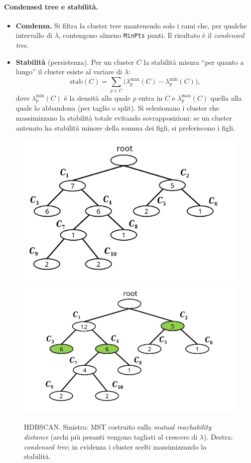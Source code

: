 \paragraph{Condensed tree e stabilità.}
\begin{itemize}
  \item \textbf{Condensa.} Si filtra la cluster tree mantenendo solo i rami che, per qualche intervallo di \(\lambda\), contengono almeno \texttt{MinPts} punti. Il risultato è il \emph{condensed tree}.
  \item \textbf{Stabilità} (persistenza). Per un cluster \(C\) la stabilità misura “per quanto a lungo” il cluster esiste al variare di \(\lambda\):
  \[
  \mathrm{stab}(C)=\sum_{p\in C}\bigl(\lambda^{\text{max}}_{p}(C)-\lambda^{\text{min}}_{p}(C)\bigr),
  \]
  dove \(\lambda^{\text{min}}_{p}(C)\) è la densità alla quale \(p\) entra in \(C\) e \(\lambda^{\text{max}}_{p}(C)\) quella alla quale lo abbandona (per taglio o split). Si selezionano i cluster che massimizzano la stabilità totale evitando sovrapposizioni: se un cluster antenato ha stabilità minore della somma dei figli, si preferiscono i figli.
\end{itemize}

\begin{figure}[htbp]
  \centering
  \includegraphics[width=.46\textwidth]{images/hdbscan_mst.png}\hfill
  \includegraphics[width=.46\textwidth]{images/hdbscan_condensed_tree.png}
  \caption{HDBSCAN. Sinistra: MST costruito sulla \emph{mutual reachability distance} (archi più pesanti vengono tagliati al crescere di \(\lambda\)). Destra: \emph{condensed tree}; in evidenza i cluster scelti massimizzando la stabilità.}
  \label{fig:hdbscan-figs}
\end{figure}

